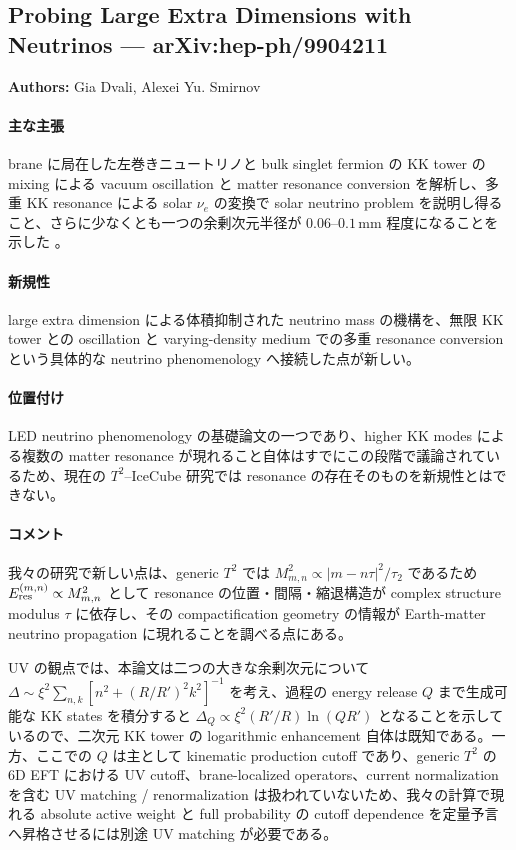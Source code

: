 \subsection{Probing Large Extra Dimensions with Neutrinos --- arXiv:hep-ph/9904211}

\textbf{Authors:} Gia Dvali, Alexei Yu. Smirnov

\paragraph{主な主張}
brane に局在した左巻きニュートリノと bulk singlet fermion の KK tower の mixing による vacuum oscillation と matter resonance conversion を解析し、多重 KK resonance による solar $\nu_e$ の変換で solar neutrino problem を説明し得ること、さらに少なくとも一つの余剰次元半径が $0.06$--$0.1\,\mathrm{mm}$ 程度になることを示した \cite{Dvali:1999LEDnu}。

\paragraph{新規性}
large extra dimension による体積抑制された neutrino mass の機構を、無限 KK tower との oscillation と varying-density medium での多重 resonance conversion という具体的な neutrino phenomenology へ接続した点が新しい。

\paragraph{位置付け}
LED neutrino phenomenology の基礎論文の一つであり、higher KK modes による複数の matter resonance が現れること自体はすでにこの段階で議論されているため、現在の $T^2$--IceCube 研究では resonance の存在そのものを新規性とはできない。

\paragraph{コメント}
我々の研究で新しい点は、generic $T^2$ では $M_{m,n}^2\propto |m-n\tau|^2/\tau_2$ であるため $E_{\rm res}^{(m,n)}\propto M_{m,n}^2$ として resonance の位置・間隔・縮退構造が complex structure modulus $\tau$ に依存し、その compactification geometry の情報が Earth-matter neutrino propagation に現れることを調べる点にある。

UV の観点では、本論文は二つの大きな余剰次元について $\Delta\sim \xi^2\sum_{n,k}[n^2+(R/R')^2k^2]^{-1}$ を考え、過程の energy release $Q$ まで生成可能な KK states を積分すると $\Delta_Q\propto \xi^2(R'/R)\ln(QR')$ となることを示しているので、二次元 KK tower の logarithmic enhancement 自体は既知である。一方、ここでの $Q$ は主として kinematic production cutoff であり、generic $T^2$ の 6D EFT における UV cutoff、brane-localized operators、current normalization を含む UV matching / renormalization は扱われていないため、我々の計算で現れる absolute active weight と full probability の cutoff dependence を定量予言へ昇格させるには別途 UV matching が必要である。
